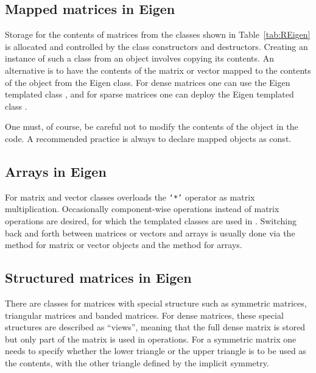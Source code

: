 \documentclass[shortnames,article]{jss}
\newcommand{\hlkwb}[1]{\textcolor[rgb]{0.13,0.54,0.13}{#1}}
\begin{document}
\subsection{Mapped matrices in Eigen}
\label{sec:mapped}

Storage for the contents of matrices from the classes shown in
Table~\ref{tab:REigen} is allocated and controlled by the class
constructors and destructors.  Creating an instance of such a class
from an  object involves copying its contents.  An
alternative is to have the contents of the  matrix or
vector mapped to the contents of the object from the Eigen class.  For
dense matrices one can use the Eigen templated class , and for
sparse matrices one can deploy the Eigen templated class .

One must, of course, be careful not to modify the contents of the
 object in the  code.  A recommended
practice is always to declare mapped objects as {\ttfamily\hlkwb{const}\normalfont}.

\subsection{Arrays in Eigen}
\label{sec:arrays}

For matrix and vector classes  overloads the \texttt{`*'}
operator as matrix multiplication.  Occasionally component-wise
operations instead of matrix operations are desired, for which the
 templated classes are used in .  Switching
back and forth between matrices or vectors and arrays is usually done
via the  method for matrix or vector objects and the
 method for arrays.

\subsection{Structured matrices in Eigen}
\label{sec:structured}

There are  classes for matrices with special structure such
as symmetric matrices, triangular matrices and banded matrices.  For
dense matrices, these special structures are described as ``views'',
meaning that the full dense matrix is stored but only part of the
matrix is used in operations.  For a symmetric matrix one needs to
specify whether the lower triangle or the upper triangle is to be used as
the contents, with the other triangle defined by the implicit symmetry.
\end{document}
